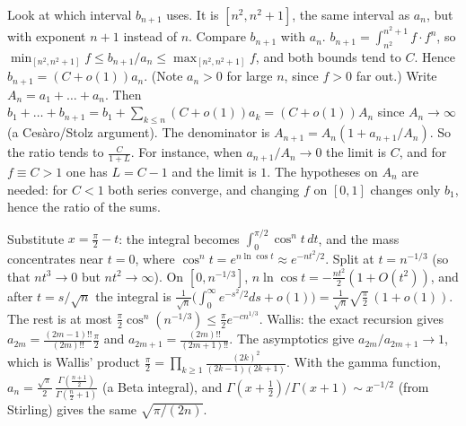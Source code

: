 \documentclass[11pt,a4paper]{article}
\begin{document}
 Look at which interval $b_{n+1}$ uses. It is $[n^2,n^2+1]$, the same interval as $a_n$, but with exponent $n+1$ instead of $n$. Compare $b_{n+1}$ with $a_n$.
 $b_{n+1}=\int_{n^2}^{n^2+1}f\cdot f^n$, so $\min_{[n^2,n^2+1]}f\le b_{n+1}/a_n\le\max_{[n^2,n^2+1]}f$, and both bounds tend to $C$. Hence $b_{n+1}=(C+o(1))a_n$. (Note $a_n>0$ for large $n$, since $f>0$ far out.)
 Write $A_n=a_1+\dots+a_n$. Then $b_1+\dots+b_{n+1}=b_1+\sum_{k\le n}(C+o(1))a_k=(C+o(1))A_n$ since $A_n\to\infty$ (a Ces\`aro/Stolz argument). The denominator is $A_{n+1}=A_n(1+a_{n+1}/A_n)$. So the ratio tends to $\frac{C}{1+L}$. For instance, when $a_{n+1}/A_n\to0$ the limit is $C$, and for $f\equiv C>1$ one has $L=C-1$ and the limit is $1$. The hypotheses on $A_n$ are needed: for $C<1$ both series converge, and changing $f$ on $[0,1]$ changes only $b_1$, hence the ratio of the sums.

 Substitute $x=\frac\pi2-t$: the integral becomes $\int_0^{\pi/2}\cos^nt\,dt$, and the mass concentrates near $t=0$, where $\cos^nt=e^{n\ln\cos t}\approx e^{-nt^2/2}$.
 Split at $t=n^{-1/3}$ (so that $nt^3\to0$ but $nt^2\to\infty$). On $[0,n^{-1/3}]$, $n\ln\cos t=-\frac{nt^2}2(1+O(t^2))$, and after $t=s/\sqrt n$ the integral is $\frac1{\sqrt n}\bigl(\int_0^\infty e^{-s^2/2}ds+o(1)\bigr)=\frac{1}{\sqrt n}\sqrt{\frac\pi2}\,(1+o(1))$. The rest is at most $\frac\pi2\cos^n(n^{-1/3})\le\frac\pi2e^{-cn^{1/3}}$.
 Wallis: the exact recursion gives $a_{2m}=\frac{(2m-1)!!}{(2m)!!}\frac\pi2$ and $a_{2m+1}=\frac{(2m)!!}{(2m+1)!!}$. The asymptotics give $a_{2m}/a_{2m+1}\to1$, which is Wallis' product $\frac\pi2=\prod_{k\ge1}\frac{(2k)^2}{(2k-1)(2k+1)}$. With the gamma function, $a_n=\frac{\sqrt\pi}2\,\frac{\Gamma(\frac{n+1}2)}{\Gamma(\frac n2+1)}$ (a Beta integral), and $\Gamma(x+\frac12)/\Gamma(x+1)\sim x^{-1/2}$ (from Stirling) gives the same $\sqrt{\pi/(2n)}$.
\end{document}
